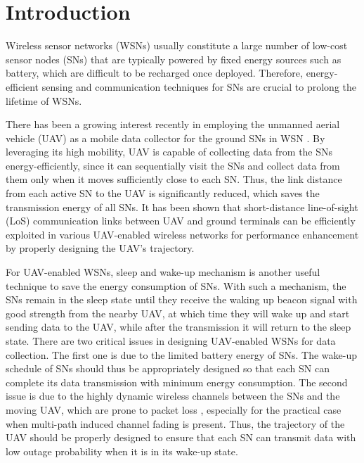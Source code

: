 \documentclass[journal]{IEEEtran}
\begin{document}
\section{Introduction}
Wireless sensor networks (WSNs) usually constitute
a large number of low-cost sensor nodes (SNs) that are typically powered by fixed energy sources such as battery, which are difficult to be recharged once deployed\cite{DWu}. Therefore, energy-efficient sensing and communication techniques for SNs are crucial to prolong the lifetime of WSNs.

There has been a growing interest recently in employing the unmanned aerial vehicle (UAV) as a mobile data collector for the ground SNs in WSN \cite{AE}. By leveraging its high mobility, UAV is capable
of collecting data from the SNs energy-efficiently, since it can sequentially visit the  SNs and collect data from them only when it moves sufficiently close to each SN. Thus, the link distance from each active SN to the UAV is significantly reduced, which saves the transmission energy of all SNs. It has been shown that short-distance line-of-sight (LoS) communication links between UAV and ground terminals can be efficiently exploited in various UAV-enabled wireless networks for performance enhancement by properly designing the UAV's trajectory\cite{YZeng1,YZeng3}.

For UAV-enabled WSNs, sleep and wake-up mechanism is another useful technique to save the energy consumption of SNs\cite{SSay}. With such a mechanism, the SNs remain in the
sleep state until they receive the waking up beacon signal with good strength
from the nearby UAV, at which time they will wake up and start sending data to the UAV,
while after the transmission it will return to the sleep state. There are two critical issues in designing UAV-enabled WSNs for data collection. The first one is due to the limited battery energy of
SNs. The wake-up schedule of SNs should thus be appropriately designed so that each SN can complete its data transmission with minimum energy consumption. The second issue is due to the highly dynamic wireless channels between the SNs and the moving UAV, which
are prone to packet loss \cite{NAhmed}, especially for the practical case when multi-path induced channel fading is present. Thus, the trajectory of the UAV should be properly designed to ensure that each SN can transmit data with low outage probability when it is in its wake-up state.
\end{document}
